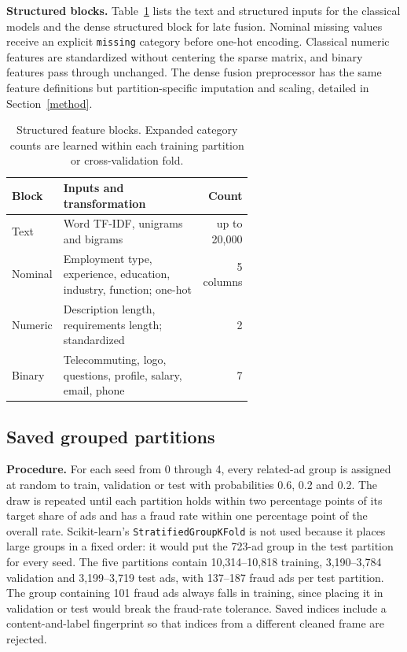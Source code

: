 \textbf{Structured blocks.} Table~\ref{tab:features} lists the text and structured inputs for the
classical models and the dense structured block for late fusion. Nominal missing values receive an
explicit \texttt{missing} category before one-hot encoding. Classical numeric features are
standardized without centering the sparse matrix, and binary features pass through unchanged. The
dense fusion preprocessor has the same feature definitions but partition-specific imputation and
scaling, detailed in Section~\ref{method}.

\begin{table}[htbp]
\centering
\small
\begin{tabular}{l>{\raggedright\arraybackslash}p{0.61\linewidth}r}
\toprule
\textbf{Block} & \textbf{Inputs and transformation} & \textbf{Count} \\
\midrule
Text & Word TF-IDF, unigrams and bigrams & up to 20,000 \\
Nominal & Employment type, experience, education, industry, function; one-hot & 5 columns \\
Numeric & Description length, requirements length; standardized & 2 \\
Binary & Telecommuting, logo, questions, profile, salary, email, phone & 7 \\
\bottomrule
\end{tabular}
\caption{Structured feature blocks. Expanded category counts are learned within each training
partition or cross-validation fold.}
\label{tab:features}
\end{table}

\subsection{Saved grouped partitions}

\textbf{Procedure.} For each seed from 0 through 4, every related-ad group is assigned at random to
train, validation or test with probabilities 0.6, 0.2 and 0.2. The draw is repeated until each
partition holds within two percentage points of its target share of ads and has a fraud rate within
one percentage point of the overall rate. Scikit-learn's \texttt{StratifiedGroupKFold} is not used
because it places large groups in a fixed order: it would put the 723-ad group in the test partition
for every seed. The five partitions contain 10,314--10,818 training, 3,190--3,784 validation and
3,199--3,719 test ads, with 137--187 fraud ads per test partition. The group containing 101 fraud ads
always falls in training, since placing it in validation or test would break the fraud-rate tolerance.
Saved indices include a content-and-label fingerprint so that indices from a different cleaned frame
are rejected.


